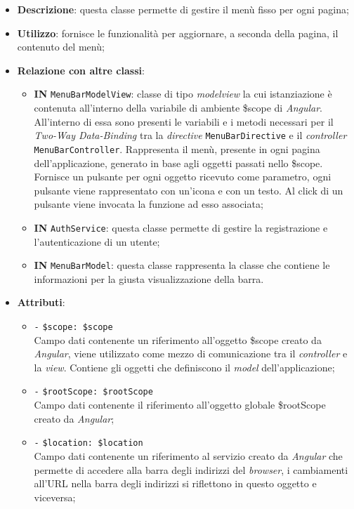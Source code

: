 \begin{itemize}
	\item \textbf{Descrizione}: questa classe permette di gestire il menù fisso per ogni pagina;
	\item \textbf{Utilizzo}: fornisce le funzionalità per aggiornare, a seconda della pagina, il contenuto del menù;
	\item \textbf{Relazione con altre classi}:
	\begin{itemize}
		\item \textbf{IN} \texttt{MenuBarModelView}: classe di tipo \textit{modelview} la cui istanziazione è contenuta all'interno della variabile di ambiente \$scope di \textit{Angular}. All'interno di essa sono presenti le variabili e i metodi necessari per il \textit{Two-Way Data-Binding} tra la \textit{directive} \texttt{MenuBarDirective} e il \textit{controller} \texttt{MenuBarController}. Rappresenta il menù, presente in ogni pagina dell'applicazione, generato in base agli oggetti passati nello \$scope. Fornisce un pulsante per ogni oggetto ricevuto come parametro, ogni pulsante viene rappresentato con un'icona e con un testo. Al click di un pulsante viene invocata la funzione ad esso associata; 
		\item \textbf{IN} \texttt{AuthService}: questa classe permette di gestire la registrazione e l'autenticazione di un utente;
		\item \textbf{IN} \texttt{MenuBarModel}: questa classe rappresenta la classe che contiene le informazioni per la giusta visualizzazione della barra.
	\end{itemize}
	\item \textbf{Attributi}:
	\begin{itemize}
		\item \texttt{-} \texttt{\$scope: \$scope} \\
		Campo dati contenente un riferimento all'oggetto \$scope creato da \textit{Angular}, viene utilizzato come mezzo di comunicazione tra il \textit{controller} e la \textit{view}. Contiene gli oggetti che definiscono il \textit{model} dell’applicazione;
		\item \texttt{-} \texttt{\$rootScope: \$rootScope} \\
		Campo dati contenente il riferimento all'oggetto globale \$rootScope creato da \textit{Angular};
		\item \texttt{-} \texttt{\$location: \$location} \\
		Campo dati contenente un riferimento al servizio creato da \textit{Angular} che permette di accedere alla barra degli indirizzi del \textit{browser}, i cambiamenti all'URL nella barra degli indirizzi si riflettono in questo oggetto e viceversa; 

\end{itemize}
\end{itemize}
